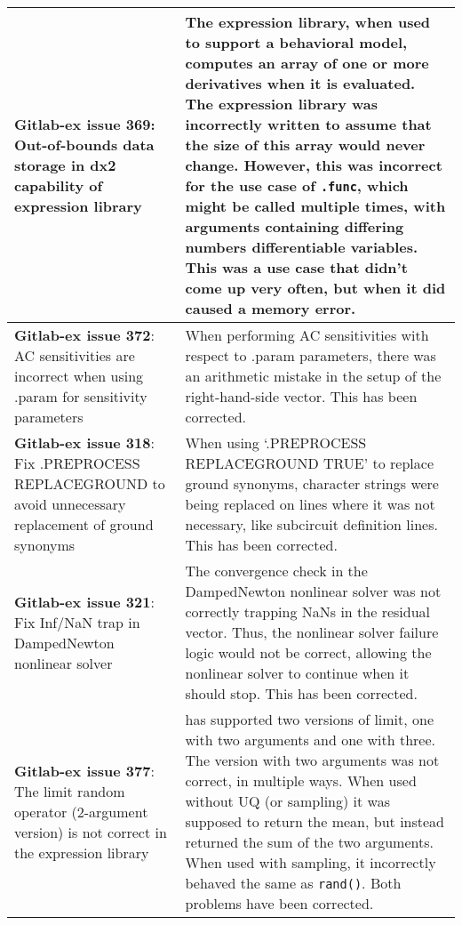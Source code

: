{\begin{longtable}[h] {>{\raggedright\small}m{2in}|>{\raggedright\let\\\tabularnewline\small}m{3.5in}}
\textbf{Gitlab-ex issue 369}:  Out-of-bounds data storage in dx2 capability of expression library  &
The expression library, when used to support a behavioral model,
computes an array of one or more derivatives when it is evaluated.
The expression library was incorrectly written to assume that the size
of this array would never change.  However, this was incorrect for the
use case of \texttt{.func}, which might be called multiple times, with
arguments containing differing numbers differentiable variables.  This
was a use case that didn't come up very often, but when it did caused
a memory error.\\ \hline

\textbf{Gitlab-ex issue 372}:  AC sensitivities are incorrect when using .param for sensitivity parameters &
When performing AC sensitivities with respect to .param parameters,
there was an arithmetic mistake in the setup of the right-hand-side
vector.  This has been corrected.  \\ \hline

\textbf{Gitlab-ex issue 318}:  Fix .PREPROCESS REPLACEGROUND to avoid 
unnecessary replacement of ground synonyms &  When using ‘.PREPROCESS REPLACEGROUND TRUE’
to replace ground synonyms, character strings were being replaced
on lines where it was not necessary, like subcircuit definition lines.
This has been corrected. \\ \hline

\textbf{Gitlab-ex issue 321}:  Fix Inf/NaN trap in DampedNewton nonlinear solver &
The convergence check in the DampedNewton nonlinear solver was not correctly trapping
NaNs in the residual vector.  Thus, the nonlinear solver failure logic would not
be correct, allowing the nonlinear solver to continue when it should stop.
This has been corrected. \\ \hline

\textbf{Gitlab-ex issue 377}:  The limit random operator (2-argument version) is not correct in the expression library &
\Xyce{} has supported two versions of limit, one with two arguments and one 
with three.  The version with two arguments was not correct, in multiple ways. 
When used without UQ (or sampling) it was supposed to return the mean, but 
instead returned the sum of the two arguments.  When used with sampling, it 
incorrectly behaved the same as \texttt{rand()}.
Both problems have been corrected.  \\ \hline

\end{longtable}
}
